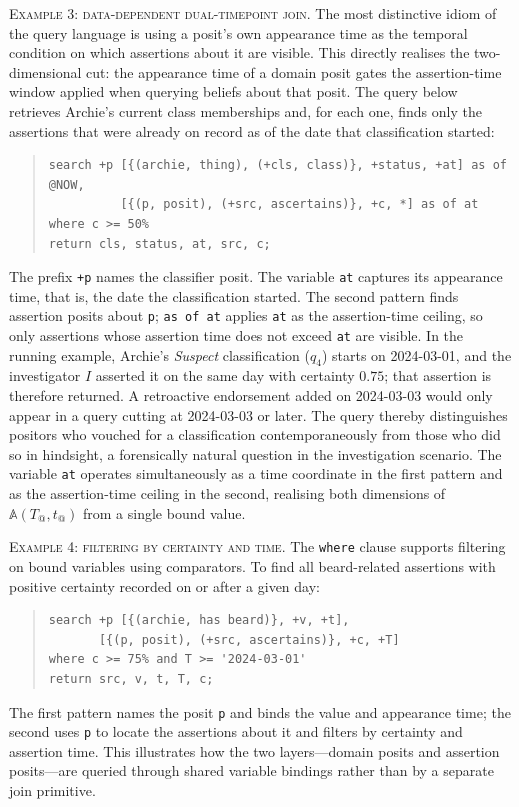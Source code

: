\documentclass[a4paper,fleqn]{cas-sc}
\begin{document}
\textsc{Example 3: data-dependent dual-timepoint join.} The most distinctive idiom of the query language is using a posit's own appearance time as the temporal condition on which assertions about it are visible. This directly realises the two-dimensional cut: the appearance time of a domain posit gates the assertion-time window applied when querying beliefs about that posit. The query below retrieves Archie's current class memberships and, for each one, finds only the assertions that were already on record as of the date that classification started:
\begin{quote}
\small
\begin{verbatim}
search +p [{(archie, thing), (+cls, class)}, +status, +at] as of @NOW,
          [{(p, posit), (+src, ascertains)}, +c, *] as of at
where c >= 50%
return cls, status, at, src, c;
\end{verbatim}
\end{quote}
The prefix \texttt{+p} names the classifier posit. The variable \texttt{at} captures its appearance time, that is, the date the classification started. The second pattern finds assertion posits about \texttt{p}; \texttt{as of at} applies \texttt{at} as the assertion-time ceiling, so only assertions whose assertion time does not exceed \texttt{at} are visible. In the running example, Archie's \textit{Suspect} classification ($q_4$) starts on 2024-03-01, and the investigator $I$ asserted it on the same day with certainty $0.75$; that assertion is therefore returned. A retroactive endorsement added on 2024-03-03 would only appear in a query cutting at 2024-03-03 or later. The query thereby distinguishes positors who vouched for a classification contemporaneously from those who did so in hindsight, a forensically natural question in the investigation scenario. The variable \texttt{at} operates simultaneously as a time coordinate in the first pattern and as the assertion-time ceiling in the second, realising both dimensions of $\mathbb{A}(T_{@}, t_{@})$ from a single bound value.

\textsc{Example 4: filtering by certainty and time.} The \texttt{where} clause supports filtering on bound variables using comparators. To find all beard-related assertions with positive certainty recorded on or after a given day:
\begin{quote}
\small
\begin{verbatim}
search +p [{(archie, has beard)}, +v, +t],
       [{(p, posit), (+src, ascertains)}, +c, +T]
where c >= 75% and T >= '2024-03-01'
return src, v, t, T, c;
\end{verbatim}
\end{quote}
The first pattern names the posit \texttt{p} and binds the value and appearance time; the second uses \texttt{p} to locate the assertions about it and filters by certainty and assertion time. This illustrates how the two layers---domain posits and assertion posits---are queried through shared variable bindings rather than by a separate join primitive.
\end{document}
